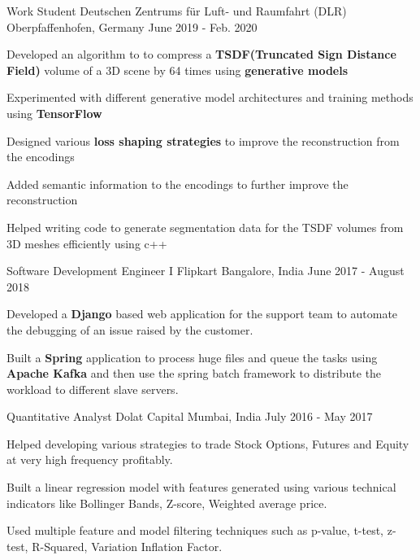 
\begin{cventries}
  \cventry
    {Work Student} %
    {Deutschen Zentrums für Luft- und Raumfahrt (DLR)} %
    {Oberpfaffenhofen, Germany} %
    {June 2019 - Feb. 2020} %
    {
      \begin{cvitems} %
        \item {Developed an algorithm to to compress a \textbf{TSDF(Truncated Sign Distance Field)} volume of a 3D scene by 64 times using \textbf{generative models}}
        \item {Experimented with different generative model architectures and training methods using \textbf{TensorFlow}}
        \item {Designed various \textbf{loss shaping strategies} to improve the reconstruction from the encodings}
        \item {Added semantic information to the encodings to further improve the reconstruction}
        \item {Helped writing code to generate segmentation data for the TSDF volumes from 3D meshes efficiently using c++}
      \end{cvitems}
    }

  \cventry
    {Software Development Engineer I} %
    {Flipkart} %
    {Bangalore, India} %
    {June 2017 - August 2018} %
    {
      \begin{cvitems} %
        \item {Developed a \textbf{Django} based web application for the support team to automate the debugging of an issue raised by the customer.}
        \item {Built a \textbf{Spring} application to process huge files and queue the tasks using \textbf{Apache Kafka} and then use the spring batch framework to distribute the workload to different slave servers.}
      \end{cvitems}
    }

  \cventry
    {Quantitative Analyst} %
    {Dolat Capital} %
    {Mumbai, India} %
    {July 2016 - May 2017} %
    {
      \begin{cvitems} %
        \item {Helped developing various strategies to trade Stock Options, Futures and Equity at very high frequency profitably.}
        \item {Built a linear regression model with features generated using various technical indicators like Bollinger Bands, Z-score, Weighted average price.}
        \item {Used multiple feature and model filtering techniques such as p-value, t-test, z-test, R-Squared, Variation Inflation Factor.}
      \end{cvitems}
    }


\end{cventries}
